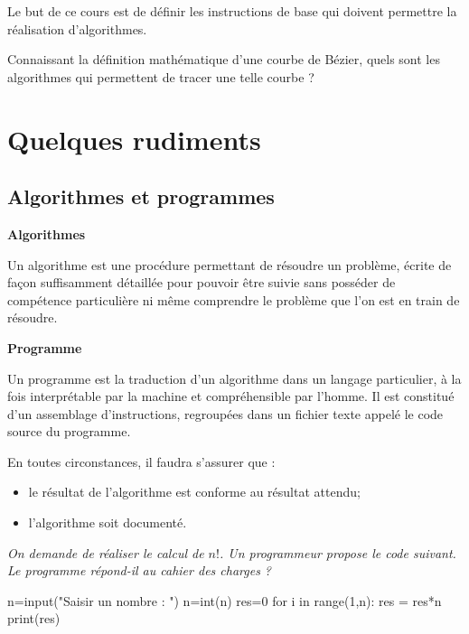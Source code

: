 \documentclass[10pt,fleqn]{article} %
\begin{document}
Le but de ce cours est de définir les instructions de base qui doivent permettre la réalisation d'algorithmes. 


Connaissant la définition mathématique d'une courbe de Bézier, quels sont les algorithmes qui permettent de tracer une telle courbe ?




\section{Quelques rudiments}

\subsection{Algorithmes et programmes \cite{wack}}
\begin{defi}
\textbf{Algorithmes}

Un algorithme est une procédure permettant de résoudre un problème, écrite de façon
suffisamment détaillée pour pouvoir être suivie sans posséder de compétence particulière
ni même comprendre le problème que l’on est en train de résoudre.
\end{defi}

\begin{defi}
\textbf{Programme}

Un programme est la traduction d’un algorithme dans un langage particulier,
à la fois interprétable par la machine et compréhensible par l’homme. Il est constitué
d’un assemblage d’instructions, regroupées dans un fichier texte appelé le code source du
programme.
\end{defi}

\begin{warn}
En toutes circonstances, il faudra s'assurer que : 
\begin{itemize}
\item le résultat de l'algorithme est conforme au résultat attendu;
\item l'algorithme soit documenté. 
\end{itemize}
\end{warn}

\begin{exemple}

\textit{On demande de réaliser le calcul de $n!$. Un programmeur propose le code suivant. Le programme répond-il au cahier des charges ?}


\begin{minipage}[c]{.35\linewidth}
\begin{py}
\begin{python}
n=input("Saisir un nombre : ")
n=int(n)
res=0
for i in range(1,n):
    res = res*n
print(res)
\end{python}
\end{py}
\end{minipage} \hfill
\begin{minipage}[c]{.62\linewidth}
\end{minipage}
\end{exemple}
\end{document}
